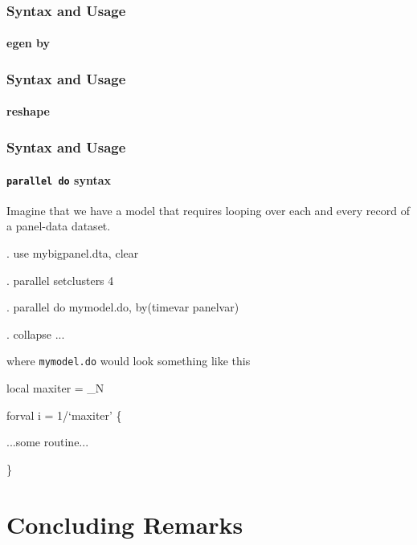 \documentclass[11pt, handout]{beamer}
\begin{document}
\begin{frame}
\frametitle{Syntax and Usage}\framesubtitle{egen by}
\footnotesize

\end{frame}

\begin{frame}[allowframebreaks=1]
\frametitle{Syntax and Usage}\framesubtitle{reshape}

\end{frame}

\begin{frame}
\frametitle{Syntax and Usage}\framesubtitle{{\tt parallel do} syntax}

Imagine that we have a model that requires looping over each and every record of a panel-data dataset.\pause

\begin{semiverbatim}

\hspace{1cm}. use mybigpanel.dta, clear

\hspace{1cm}. parallel setclusters 4

\hspace{1cm}. parallel do mymodel.do, by(timevar panelvar)
    
\hspace{1cm}. collapse ...
\end{semiverbatim}   \pause

where {\tt mymodel.do} would look something like this \pause

\begin{semiverbatim}
\hspace{1cm}local maxiter = \_N

\hspace{1cm}forval i = 1/`maxiter' \{

\hspace{2cm}...some routine...

\hspace{1cm}\}
\end{semiverbatim}
\end{frame}

\section{Concluding Remarks}
\end{document}
